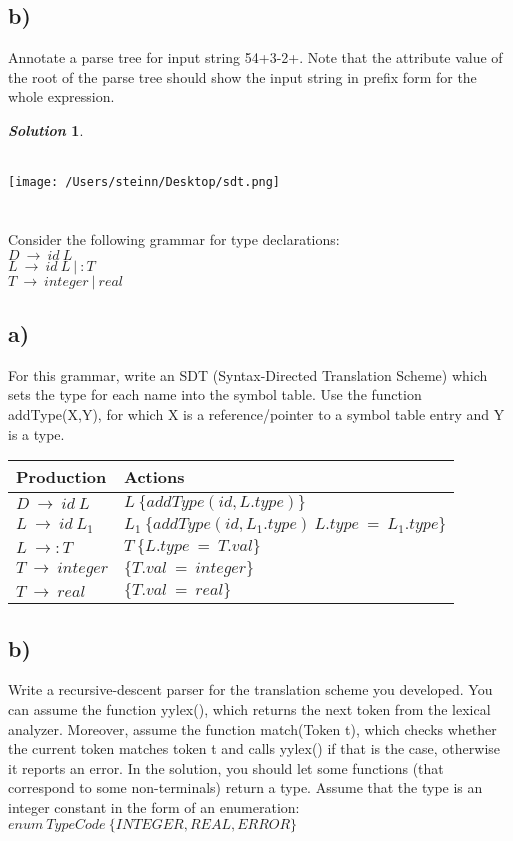 \documentclass[11pt, a4paper]{article}
\newtheorem*{solution}{\emph{Solution}}
\begin{document}
\subsection*{b)}
	Annotate a parse tree for input string 54+3-2+. Note that the attribute value of the root of the parse tree should show the input string in prefix form for the whole expression.

\begin{solution}\end{solution}~\\
\texttt{[image: /Users/steinn/Desktop/sdt.png]}

\section{}
	Consider the following grammar for type declarations:\\
	$D~\rightarrow~id~L$\\
	$L~\rightarrow~id~L~|~:T$\\
	$T~\rightarrow~integer~|~real$\\

\subsection*{a)}
	For this grammar, write an SDT (Syntax-Directed Translation Scheme) which sets the type for each name into the symbol table. Use the function addType(X,Y), for which X is a reference/pointer to a symbol table entry and Y is a type.

\begin{tabular}{|l|l|}
\hline
\hline
Production & Actions\\
\hline
$D~\rightarrow~id~L$ & $L~\{addType(id,L.type)\}$\\
\hline
$L~\rightarrow~id~L_1$ & $L_1~\{addType(id,L_1.type)~L.type~=~L_1.type\}$\\
\hline
$L~\rightarrow:T$ & $T~\{L.type~=~T.val\}$\\
\hline
$T~\rightarrow~integer$ & $\{T.val~=~integer\}$\\
\hline
$T~\rightarrow~real$ & $\{T.val~=~real\}$\\
\hline
\end{tabular}


\subsection*{b)}
	Write a recursive-descent parser for the translation scheme you developed. You can assume the function yylex(), which returns the next token from the lexical analyzer. Moreover, assume the function match(Token t), which checks whether the current token matches token t and calls yylex() if that is the case, otherwise it reports an error. In the solution, you should let some functions (that correspond to some non-terminals) return a type. Assume that the type is an integer constant in the form of an enumeration:\\
$enum~TypeCode~\{ INTEGER, REAL, ERROR \}$
\end{document}
